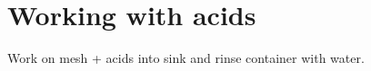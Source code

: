 \section{Working with acids}
 Work on mesh +  acids into sink and rinse container with water.

\newpage